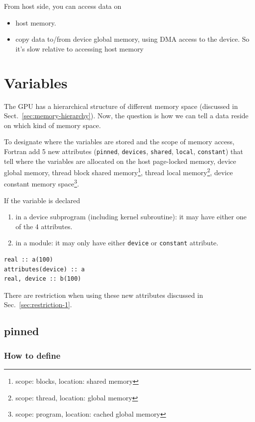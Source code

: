 From host side, you can access data on 
\begin{itemize}
\item host memory.
\item copy data to/from device global memory, using DMA access to the
  device. So it's slow relative to accessing host memory
\end{itemize}




\section{Variables}
\label{sec:variables-1}

The GPU has a hierarchical structure of different memory space
(discussed in Sect.~\ref{sec:memory-hierarchy}).  Now, the question is
how we can tell a data reside on which kind of memory space.

To designate where the variables are stored and the scope of memory
access, Fortran add 5 new attributes (\verb!pinned!, \verb.devices.,
\verb.shared., \verb.local., \verb.constant.) that tell where the
variables are allocated on the host page-locked memory, device global
memory, thread block shared
memory\footnote{scope: blocks, location: shared memory}, thread local
memory\footnote{scope: thread, location: global memory}, device
constant memory
space\footnote{scope: program, location: cached global memory}.

If the variable is declared
\begin{enumerate}
\item in a device subprogram (including kernel subroutine): it may
  have either one of the 4 attributes.
\item in a module: it may only have either \verb.device. or
  \verb.constant. attribute.
\end{enumerate}

\begin{lstlisting}
real :: a(100)
attributes(device) :: a
real, device :: b(100)
\end{lstlisting}

There are restriction when using these new attributes discussed in
Sec.~\ref{sec:restriction-1}. 


\subsection{pinned}
\label{sec:pinned}

\subsubsection{How to define}
\label{sec:how-define}

